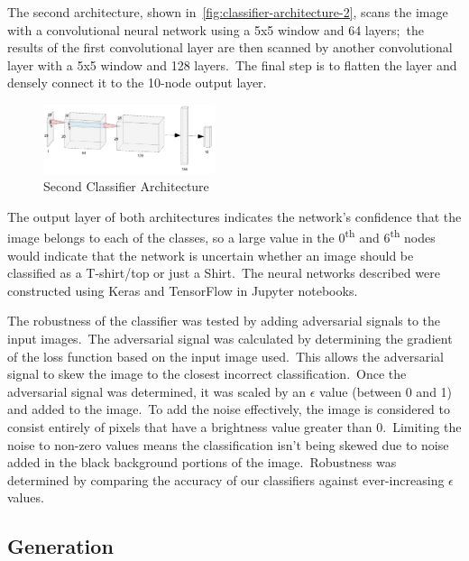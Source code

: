 \documentclass[conference]{IEEEtran}
\begin{document}
    The second architecture, shown in~\autoref{fig:classifier-architecture-2}, scans the image with a convolutional neural network using a 5x5 window and 64 layers;\ the results of the first convolutional layer are then scanned by another convolutional layer with a 5x5 window and 128 layers.\ The final step is to flatten the layer and densely connect it to the 10-node output layer.

    \begin{figure}
        \caption{Second Classifier Architecture}
        \label{fig:classifier-architecture-2}
        \begin{center}
            \includegraphics[width=0.45\textwidth]{Second_Classifier_Architecture.png}
        \end{center}
    \end{figure}

    The output layer of both architectures indicates the network's confidence that the image belongs to each of the classes, so a large value in the 0\textsuperscript{th} and 6\textsuperscript{th} nodes would indicate that the network is uncertain whether an image should be classified as a T-shirt/top or just a Shirt.\ The neural networks described were constructed using Keras and TensorFlow in Jupyter notebooks.

    The robustness of the classifier was tested by adding adversarial signals to the input images.\ The adversarial signal was calculated by determining the gradient of the loss function based on the input image used.\ This allows the adversarial signal to skew the image to the closest incorrect classification.\ Once the adversarial signal was determined, it was scaled by an \(\epsilon\) value (between 0 and 1) and added to the image.\ To add the noise effectively, the image is considered to consist entirely of pixels that have a brightness value greater than 0.\ Limiting the noise to non-zero values means the classification isn't being skewed due to noise added in the black background portions of the image.\ Robustness was determined by comparing the accuracy of our classifiers against ever-increasing \(\epsilon\) values.

    \subsection{Generation}\label{subsec:approach-generation}
\end{document}
